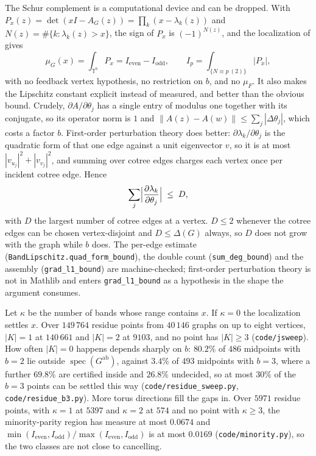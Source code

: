 \documentclass[11pt]{article}
\theoremstyle{remark}
\begin{document}
The Schur complement is a computational device and can be dropped. With
$P_x(z)=\det(xI-A_G(z))=\prod_k(x-\lambda_k(z))$ and $N(z)=\#\{k:\lambda_k(z)>x\}$, the sign
of $P_x$ is $(-1)^{N(z)}$, and the localization of \cite{PartI} gives
\[
   \mu_G(x)=\int_{\mathbb T^b}P_x
   =I_{\mathrm{even}}-I_{\mathrm{odd}},\qquad
   I_p=\int_{\{N\equiv p\ (2)\}}|P_x| ,
\]
with no feedback vertex hypothesis, no restriction on $b$, and no $\mu_F$. It also makes the
Lipschitz constant explicit instead of measured, and better than the obvious bound. Crudely,
$\partial A/\partial\theta_j$ has a single entry of modulus one together with its conjugate,
so its operator norm is $1$ and $\|A(z)-A(w)\|\le\sum_j|\Delta\theta_j|$, which costs a factor
$b$. First-order perturbation theory does better: $\partial\lambda_k/\partial\theta_j$ is the
quadratic form of that one edge against a unit eigenvector $v$, so it is at most
$|v_{u_j}|^2+|v_{v_j}|^2$, and summing over cotree edges charges each vertex once per incident
cotree edge. Hence
\[
   \sum_j\Bigl|\frac{\partial\lambda_k}{\partial\theta_j}\Bigr|\;\le\;D ,
\]
with $D$ the largest number of cotree edges at a vertex. $D\le2$ whenever the cotree edges can
be chosen vertex-disjoint and $D\le\Delta(G)$ always, so $D$ does not grow with the graph while
$b$ does. The per-edge estimate (\texttt{BandLipschitz.quad\_form\_bound}), the double count
(\texttt{sum\_deg\_bound}) and the assembly (\texttt{grad\_l1\_bound}) are machine-checked;
first-order perturbation theory is not in Mathlib and enters \texttt{grad\_l1\_bound} as a
hypothesis in the shape the argument consumes.

Let $\kappa$ be the number of bands whose range contains $x$. If $\kappa=0$ the localization
settles $x$. Over $149\,764$ residue points from $40\,146$ graphs on up to eight vertices,
$|K|=1$ at $140\,661$ and $|K|=2$ at $9103$, and no point has $|K|\ge3$
(\texttt{code/jsweep}). How often $|K|=0$ happens depends sharply on $b$: $80.2\%$ of $486$
midpoints
with $b=2$ lie outside $\operatorname{spec}(G^{\mathrm{ab}})$, against $3.4\%$ of $493$
midpoints with $b=3$, where a further $69.8\%$ are certified inside and $26.8\%$ undecided,
so at most $30\%$ of the $b=3$ points can be settled this way
(\texttt{code/residue\_sweep.py}, \texttt{code/residue\_b3.py}). More torus directions fill
the gaps in. Over $5971$ residue points, with $\kappa=1$ at $5397$ and $\kappa=2$ at $574$
and no point with $\kappa\ge3$, the minority-parity region has measure at most
$0.0674$ and
$\min(I_{\mathrm{even}},I_{\mathrm{odd}})/\max(I_{\mathrm{even}},I_{\mathrm{odd}})$ is at
most $0.0169$ (\texttt{code/minority.py}), so the two classes are not close to cancelling.
\end{document}
